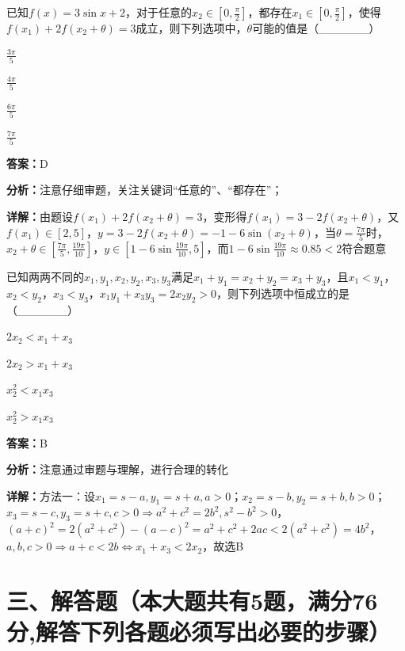 \begin{question}[points=5]
已知$f(x)=3\sin x+2$，对于任意的$x_2\in[0,\frac{\pi}{2}]$，都存在$x_1\in[0,\frac{\pi}{2}]$，使得$f(x_1)+2f(x_2+\theta)=3$成立，则下列选项中，$\theta$可能的值是（\_\_\_\_\_\_）
\begin{choices}
  \item $\frac{3\pi}{5}$
  \item $\frac{4\pi}{5}$
  \item $\frac{6\pi}{5}$
  \item $\frac{7\pi}{5}$
\end{choices}
\begin{solution}
\textbf{答案：}D

\textbf{分析：}注意仔细审题，关注关键词“任意的”、“都存在”；

\textbf{详解：}由题设$f(x_1)+2f(x_2+\theta)=3$，变形得$f(x_1)=3-2f(x_2+\theta)$，又$f(x_1)\in[2,5]$，$y=3-2f(x_2+\theta)=-1-6\sin(x_2+\theta)$，当$\theta=\frac{7\pi}{5}$时，$x_2+\theta\in[\frac{7\pi}{5},\frac{19\pi}{10}]$，$y\in[1-6\sin\frac{19\pi}{10},5]$，而$1-6\sin\frac{19\pi}{10}\approx0.85<2$符合题意
\end{solution}
\end{question}

\begin{question}[points=5]
已知两两不同的$x_1,y_1,x_2,y_2,x_3,y_3$满足$x_1+y_1=x_2+y_2=x_3+y_3$，且$x_1<y_1$，$x_2<y_2$，$x_3<y_3$，$x_1y_1+x_3y_3=2x_2y_2>0$，则下列选项中恒成立的是（\_\_\_\_\_\_）
\begin{choices}
  \item $2x_2<x_1+x_3$
  \item $2x_2>x_1+x_3$
  \item $x_2^2<x_1x_3$
  \item $x_2^2>x_1x_3$
\end{choices}
\begin{solution}
\textbf{答案：}B

\textbf{分析：}注意通过审题与理解，进行合理的转化

\textbf{详解：}方法一：设$x_1=s-a, y_1=s+a, a>0$；$x_2=s-b, y_2=s+b, b>0$；$x_3=s-c, y_3=s+c, c>0\Rightarrow a^2+c^2=2b^2, s^2-b^2>0$，$(a+c)^2=2(a^2+c^2)-(a-c)^2=a^2+c^2+2ac<2(a^2+c^2)=4b^2$，$a,b,c>0\Rightarrow a+c<2b\Leftrightarrow x_1+x_3<2x_2$，故选B
\end{solution}
\end{question}

\section*{三、解答题（本大题共有5题，满分76分,解答下列各题必须写出必要的步骤）}

